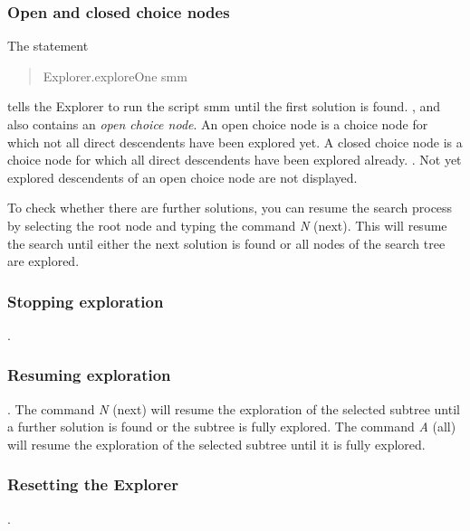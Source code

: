 \documentclass[a4paper]{scrartcl}
\begin{document}
\subsubsection{Open and closed choice nodes}
The statement
\begin{quote}
Explorer.exploreOne smm
\end{quote}
tells the Explorer to run the script smm until the first solution is 
found. , and also
contains an {\it open choice node}. An open choice node is a choice 
node for which not all direct descendents have been explored yet. A 
closed choice node is a choice node for which all direct descendents 
have been explored already. . Not yet 
explored descendents of an open choice node are not displayed.\\
\par
To check whether there are further solutions, you can resume the 
search process by selecting the root node and typing the command {\it N}
(next). This will resume the search until either the next solution 
is found or all nodes of the search tree are explored.

\subsubsection{Stopping exploration}
.

\subsubsection{Resuming exploration}
. The command {\it N} (next) 
will resume the exploration of the selected subtree until a further 
solution is found or the subtree is fully explored. The command {\it A}
(all) will resume the exploration of the selected subtree until it 
is fully explored.\\

\subsubsection{Resetting the Explorer}
.
\end{document}
